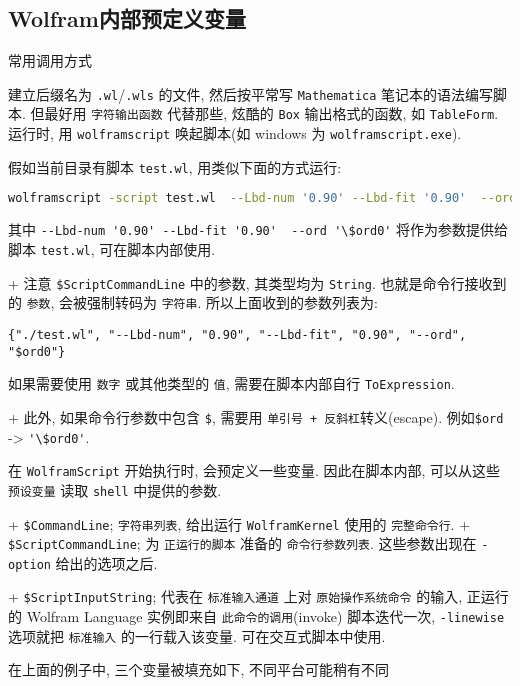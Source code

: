 \subsection{Wolfram内部预定义变量}

常用调用方式

建立后缀名为 \verb`.wl`/\verb`.wls` 的文件, 然后按平常写 \verb`Mathematica` 笔记本的语法编写脚本.
但最好用 \verb`字符输出函数` 代替那些, 炫酷的 \verb`Box` 输出格式的函数, 如 \verb`TableForm`.
运行时, 用 \verb`wolframscript` 唤起脚本(如 windows 为 \verb`wolframscript.exe`).

假如当前目录有脚本 \verb`test.wl`, 用类似下面的方式运行:
\begin{lstlisting}[language=bash]
wolframscript -script test.wl  --Lbd-num '0.90' --Lbd-fit '0.90'  --ord '\$ord0'
\end{lstlisting}

其中 \verb`--Lbd-num '0.90' --Lbd-fit '0.90'  --ord '\$ord0'` 将作为参数提供给脚本 \verb`test.wl`, 可在脚本内部使用.

+ 注意 \verb`$ScriptCommandLine` 中的参数, 其类型均为 \verb`String`.
也就是命令行接收到的 \verb`参数`, 会被强制转码为 \verb`字符串`.
所以上面收到的参数列表为:
\begin{lstlisting}[language=wolfram]
{"./test.wl", "--Lbd-num", "0.90", "--Lbd-fit", "0.90", "--ord", "$ord0"}
\end{lstlisting}

如果需要使用 \verb`数字` 或其他类型的 \verb`值`, 需要在脚本内部自行 \verb`ToExpression`.

+ 此外, 如果命令行参数中包含 \verb`$`, 需要用 \verb`单引号 + 反斜杠`转义(escape).
例如\verb`$ord` -> \verb`'\$ord0'`.

在 \verb`WolframScript` 开始执行时, 会预定义一些变量.
因此在脚本内部, 可以从这些 \verb`预设变量` 读取 \verb`shell` 中提供的参数.

+ \verb`$CommandLine`; \verb`字符串列表`, 给出运行 \verb`WolframKernel` 使用的 \verb`完整命令行`.
+ \verb`$ScriptCommandLine`; 为 \verb`正运行的脚本` 准备的 \verb`命令行参数列表`.
这些参数出现在 \verb`-option` 给出的选项之后.

+ \verb`$ScriptInputString`; 代表在 \verb`标准输入通道` 上对 \verb`原始操作系统命令` 的输入,
正运行的 Wolfram Language 实例即来自 \verb`此命令的调用`(invoke)
脚本迭代一次, \verb`-linewise` 选项就把 \verb`标准输入` 的一行载入该变量.
可在交互式脚本中使用.

在上面的例子中, 三个变量被填充如下, 不同平台可能稍有不同

